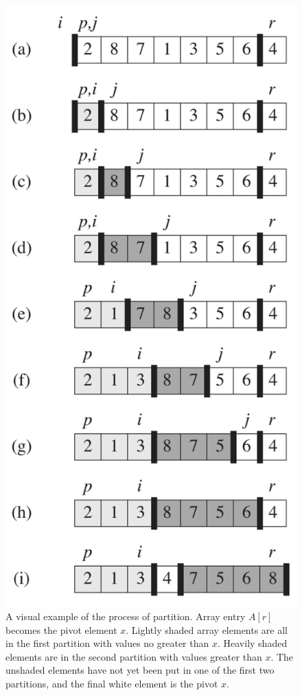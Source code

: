 \documentclass{article}
\begin{document}
\begin{figure}[!ht]
\includegraphics[scale=0.45]{quicksort_example}
\caption{
    A visual example of the process of partition. Array entry $A[r]$ becomes the pivot element $x$. Lightly shaded array elements are all in the first partition with values no greater than $x$. Heavily shaded elements are in the second partition with values greater than $x$. The unshaded elements have not yet been put in one of the first two partitions, and the final white element is the pivot $x$. 
}
\end{figure}
\end{document}

